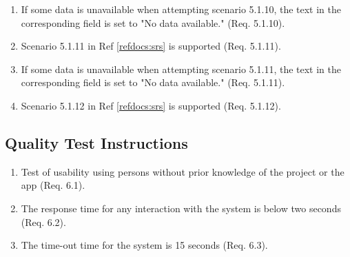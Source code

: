 \documentclass[a4paper]{article}
\newlength{\testlabellength}
\newenvironment{testlist}{\begin{enumerate}[label=\bfseries Instruction \thesubsection.\arabic* , labelindent=0pt, labelwidth=\testlabellength , leftmargin=2cm]}{\end{enumerate}}
\begin{document}
\begin{appendices}
\begin{testlist}
	\item If some data is unavailable when attempting scenario 5.1.10, the text in the corresponding field is set to "No data available." (Req. 5.1.10).
	
	\item Scenario 5.1.11 in Ref \ref{refdocs:srs} is supported (Req. 5.1.11).
	
	\item If some data is unavailable when attempting scenario 5.1.11, the text in the corresponding field is set to "No data available." (Req. 5.1.11).
	
	\item Scenario 5.1.12 in Ref \ref{refdocs:srs} is supported (Req. 5.1.12).
\end{testlist}

\subsection{Quality Test Instructions}

\begin{testlist}
	\item Test of usability using persons without prior knowledge of the project or the app (Req. 6.1).
	
	\item The response time for any interaction with the system is below two seconds (Req. 6.2).
	
	\item The time-out time for the system is 15 seconds (Req. 6.3). 
	
\end{testlist}

\clearpage

\end{appendices}
\end{document}
